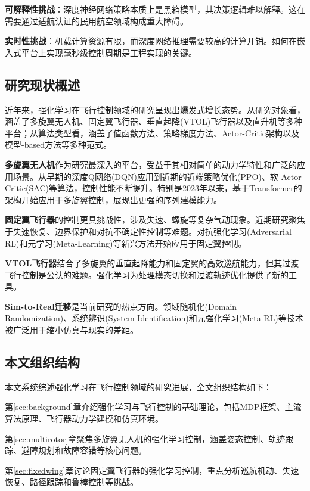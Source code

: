 \documentclass[12pt,a4paper]{ctexart}
\begin{document}
\textbf{可解释性挑战}：深度神经网络策略本质上是黑箱模型，其决策逻辑难以解释。这在需要通过适航认证的民用航空领域构成重大障碍。

\textbf{实时性挑战}：机载计算资源有限，而深度网络推理需要较高的计算开销。如何在嵌入式平台上实现毫秒级控制周期是工程实现的关键。

\subsection{研究现状概述}

近年来，强化学习在飞行控制领域的研究呈现出爆发式增长态势。从研究对象看，涵盖了多旋翼无人机、固定翼飞行器、垂直起降(VTOL)飞行器以及直升机等多种平台；从算法类型看，涵盖了值函数方法、策略梯度方法、Actor-Critic架构以及模型-based方法等多种范式。

\textbf{多旋翼无人机}作为研究最深入的平台，受益于其相对简单的动力学特性和广泛的应用场景。从早期的深度Q网络(DQN)应用到近期的近端策略优化(PPO)、软 Actor-Critic(SAC)等算法，控制性能不断提升。特别是2023年以来，基于Transformer的架构开始应用于多旋翼控制，展现出更强的序列建模能力。

\textbf{固定翼飞行器}的控制更具挑战性，涉及失速、螺旋等复杂气动现象。近期研究聚焦于失速恢复、边界保护和对抗不确定性控制等难题。对抗强化学习(Adversarial RL)和元学习(Meta-Learning)等新兴方法开始应用于固定翼控制。

\textbf{VTOL飞行器}结合了多旋翼的垂直起降能力和固定翼的高效巡航能力，但其过渡飞行控制是公认的难题。强化学习为处理模态切换和过渡轨迹优化提供了新的工具。

\textbf{Sim-to-Real迁移}是当前研究的热点方向。领域随机化(Domain Randomization)、系统辨识(System Identification)和元强化学习(Meta-RL)等技术被广泛用于缩小仿真与现实的差距。

\subsection{本文组织结构}

本文系统综述强化学习在飞行控制领域的研究进展，全文组织结构如下：

第\ref{sec:background}章介绍强化学习与飞行控制的基础理论，包括MDP框架、主流算法原理、飞行器动力学建模和仿真环境。

第\ref{sec:multirotor}章聚焦多旋翼无人机的强化学习控制，涵盖姿态控制、轨迹跟踪、避障规划和故障容错等核心问题。

第\ref{sec:fixedwing}章讨论固定翼飞行器的强化学习控制，重点分析巡航机动、失速恢复、路径跟踪和鲁棒控制等挑战。
\end{document}
